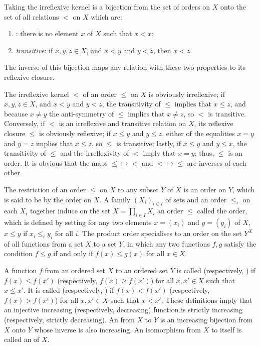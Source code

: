 \documentclass{article}
\begin{document}
\begin{theorem}
  \label{thm:ztywp662}
  Taking the irreflexive kernel is a bijection from the set of orders
  on \(X\) onto the set of all relations \(<\) on \(X\) which are:
  \begin{enumerate}
  \item {}: there is no element \(x\) of \(X\)
    such that \(x < x\);
  \item \emph{transitive}: if \(x,y,z \in X\), and \(x < y\) and
    \(y < z\), then \(x < z\).
  \end{enumerate}
  The inverse of this bijection maps any relation with these two
  properties to its reflexive closure.
\end{theorem}

The irreflexive kernel \(<\) of an order \(\leq\) on \(X\) is
obviously irreflexive; if \(x,y,z \in X\), and \(x < y\) and
\(y < z\), the transitivity of \(\leq\) implies that \(x \leq z\), and
because \(x \neq y\) the anti-symmetry of \(\leq\) implies that
\(x \neq z\), so \(<\) is transitive.  Conversely, if \(<\) is an
irreflexive and transitive relation on \(X\), its reflexive closure
\(\leq\) is obviously reflexive; if \(x \leq y\) and \(y \leq z\),
either of the equalities \(x = y\) and \(y = z\) implies that
\(x \leq z\), so \(\leq\) is transitive; lastly, if \(x \leq y\) and
\(y \leq x\), the transitivity of \(\leq\) and the irreflexivity of
\(<\) imply that \(x = y\); thus, \(\leq\) is an order.  It is obvious
that the maps \(\leq \mapsto <\) and \(< \mapsto \leq\) are inverses
of each other.

The restriction of an order \(\leq\) on \(X\) to any subset \(Y\) of
\(X\) is an order on \(Y\), which is said to be  by
the order on \(X\).  A family \((X_i)_{i \in I}\) of sets and an order
\(\leq_i\) on each \(X_i\) together induce on the set
\(X = \prod_{i \in I}X_i\) an order \(\leq\) called the
 order, which is defined by setting for any two
elements \(x= (x_i)\) and \(y = (y_i)\) of \(X\), \(x \leq y\) if
\(x_i \leq_i y_i\) for all \(i\).  The product order specialises to an
order on the set \(Y^X\) of all functions from a set \(X\) to a set
\(Y\), in which any two functions \(f,g\) satisfy the condition
\(f \leq g\) if and only if \(f(x) \leq g(x)\) for all \(x \in X\).

A function \(f\) from an ordered set \(X\) to an ordered set \(Y\) is
called  (respectively, )
if \(f(x) \leq f(x')\) (respectively, \(f(x) \geq f(x')\)) for all
\(x, x' \in X\) such that \(x \leq x'\).  It is called
 (respectively, ) if \(f(x) < f(x')\) (respectively, \(f(x) > f(x')\))
for all \(x, x' \in X\) such that \(x < x'\).  These definitions imply
that an injective increasing (respectively, decreasing) function is
strictly increasing (respectively, strictly decreasing).  An
 from \(X\) to \(Y\) is an increasing bijection
from \(X\) onto \(Y\) whose inverse is also increasing.  An
isomorphism from \(X\) to itself is called an 
of \(X\).
\end{document}
